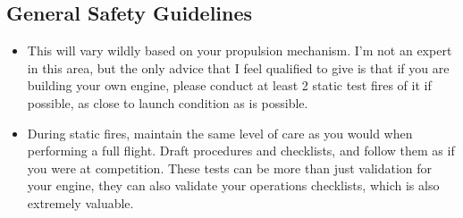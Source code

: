 \subsection{General Safety Guidelines}
\begin{itemize}
\item This will vary wildly based on your propulsion mechanism. I’m not an expert in this area, but the only advice that I feel qualified to give is that if you are building your own engine, please conduct at least 2 static test fires of it if possible, as close to launch condition as is possible. 
\item During static fires, maintain the same level of care as you would when performing a full flight. Draft procedures and checklists, and follow them as if you were at competition. These tests can be more than just validation for your engine, they can also validate your operations checklists, which is also extremely valuable.
\end{itemize}
